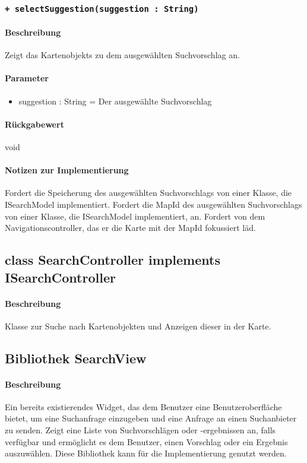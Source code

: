 \subsubsection{\texttt{+ selectSuggestion(suggestion : String)}}%
\paragraph*{Beschreibung}
Zeigt das Kartenobjekts zu dem ausgewählten Suchvorschlag an.
\paragraph*{Parameter}
\begin{itemize}
    \item suggestion : String = Der ausgewählte Suchvorschlag
\end{itemize}
\paragraph*{Rückgabewert}
void
\paragraph*{Notizen zur Implementierung}
Fordert die Speicherung des ausgewählten Suchvorschlags von einer Klasse, die ISearchModel implementiert.
Fordert die MapId des ausgewählten Suchvorschlags von einer Klasse, die ISearchModel implementiert, an.
Fordert von dem Navigationscontroller, das er die Karte mit der MapId fokussiert läd.


\subsection{class SearchController implements ISearchController}
\paragraph*{Beschreibung}
Klasse zur Suche nach Kartenobjekten und Anzeigen dieser in der Karte.


\subsection{Bibliothek SearchView}
\paragraph*{Beschreibung}
Ein bereits existierendes Widget, das dem Benutzer eine Benutzeroberfläche bietet, um eine Suchanfrage einzugeben und eine Anfrage an einen Suchanbieter zu senden. 
Zeigt eine Liste von Suchvorschlägen oder -ergebnissen an, falls verfügbar 
und ermöglicht es dem Benutzer, einen Vorschlag oder ein Ergebnis auszuwählen.
Diese Bibliothek kann für die Implementierung genutzt werden.
